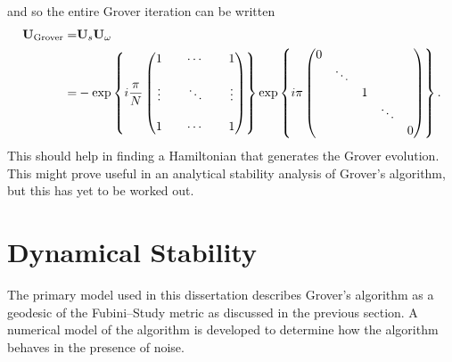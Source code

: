and so the entire Grover iteration can be written
\begin{equation}
\begin{split}
{\bf U}_{\text{Grover}} =& {\bf U}_s {\bf U}_\omega\\ 
=& - \exp \left\lbrace  i\frac{\pi}{N}
                \begin{pmatrix}
                    1      &        & \cdots &      & 1 \\
                    \\
                    \vdots &        & \ddots &      & \vdots \\
                    \\
                    1      &        & \cdots &      & 1
                \end{pmatrix}
\right\rbrace
\exp \left\lbrace  i\pi
                \begin{pmatrix}
                    0       &        &        &        &  \\
                            & \ddots &        &        &  \\
                            &        & 1      &        &  \\
                            &        &        & \ddots &  \\
                            &        &        &        & 0
                \end{pmatrix}
\right\rbrace.
\end{split}
\end{equation}
This should help in finding a Hamiltonian that generates 
the Grover evolution.  
This might prove useful in an analytical stability analysis
of Grover's algorithm, but this has yet to be worked out.



\section{Dynamical Stability}
\label{sec:dynamicalStability}
%


The primary model used in this dissertation describes 
Grover's algorithm as a geodesic of the Fubini--Study metric 
as discussed in the previous section.
A numerical model of the algorithm is developed to determine
how the algorithm behaves in the presence of noise.

